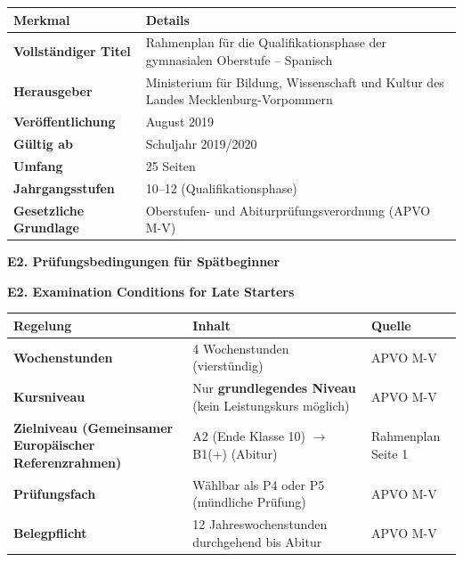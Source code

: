 \documentclass[10pt,a4paper]{article}
\newcommand{\secbil}[2]{%
\vspace{6pt}
\noindent\colorbox{spaet}{\parbox{0.48\textwidth}{\color{white}\bfseries\small #1}}%
\hfill%
\colorbox{english}{\parbox{0.48\textwidth}{\color{white}\bfseries\small #2}}
\vspace{3pt}
}
\begin{document}
\vspace{2mm}

\begin{center}
\small
\begin{tabular}{|p{4cm}|p{10cm}|}
\hline
\rowcolor{lightgray}
\textbf{Merkmal} & \textbf{Details} \\
\hline
\textbf{Vollständiger Titel} & Rahmenplan für die Qualifikationsphase der gymnasialen Oberstufe -- Spanisch \\
\hline
\textbf{Herausgeber} & Ministerium für Bildung, Wissenschaft und Kultur des Landes Mecklenburg-Vorpommern \\
\hline
\textbf{Veröffentlichung} & August 2019 \\
\hline
\textbf{Gültig ab} & Schuljahr 2019/2020 \\
\hline
\textbf{Umfang} & 25 Seiten \\
\hline
\textbf{Jahrgangsstufen} & 10--12 (Qualifikationsphase) \\
\hline
\textbf{Gesetzliche Grundlage} & Oberstufen- und Abiturprüfungsverordnung (APVO M-V) \\
\hline
\end{tabular}
\end{center}

\vspace{3mm}

\secbil{E2. Prüfungsbedingungen für Spätbeginner}{E2. Examination Conditions for Late Starters}

\vspace{2mm}

\begin{center}
\small
\begin{tabular}{|p{5cm}|p{5cm}|p{4cm}|}
\hline
\rowcolor{lightgray}
\textbf{Regelung} & \textbf{Inhalt} & \textbf{Quelle} \\
\hline
\textbf{Wochenstunden} & 4 Wochenstunden (vierstündig) & APVO M-V \\
\hline
\textbf{Kursniveau} & Nur \textbf{grundlegendes Niveau} (kein Leistungskurs möglich) & APVO M-V \\
\hline
\textbf{Zielniveau (Gemeinsamer Europäischer Referenzrahmen)} & A2 (Ende Klasse 10) $\rightarrow$ B1(+) (Abitur) & Rahmenplan Seite 1 \\
\hline
\textbf{Prüfungsfach} & Wählbar als P4 oder P5 (mündliche Prüfung) & APVO M-V \\
\hline
\textbf{Belegpflicht} & 12 Jahreswochenstunden durchgehend bis Abitur & APVO M-V \\
\hline
\end{tabular}
\end{center}
\end{document}
